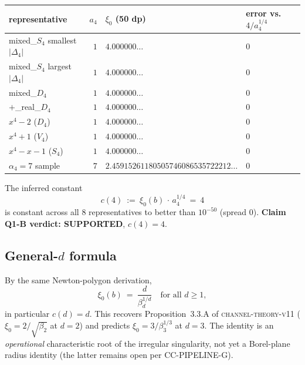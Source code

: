 \begin{tabular}{lrll}
\hline
representative & $a_4$ & $\xi_0$ (50 dp) & error vs.\ $4/a_4^{1/4}$ \\
\hline
mixed\_$S_4$ smallest $|\Delta_4|$ & $1$ & $4.000000\ldots$ & $0$ \\
mixed\_$S_4$ largest  $|\Delta_4|$ & $1$ & $4.000000\ldots$ & $0$ \\
mixed\_$D_4$                       & $1$ & $4.000000\ldots$ & $0$ \\
$+$\_real\_$D_4$                   & $1$ & $4.000000\ldots$ & $0$ \\
$x^4-2$ ($D_4$)                    & $1$ & $4.000000\ldots$ & $0$ \\
$x^4+1$ ($V_4$)                    & $1$ & $4.000000\ldots$ & $0$ \\
$x^4-x-1$ ($S_4$)                  & $1$ & $4.000000\ldots$ & $0$ \\
$\alpha_4=7$ sample                & $7$ & $2.45915261180505746086535722212\ldots$ & $0$ \\
\hline
\end{tabular}

The inferred constant
\[
c(4)\ :=\ \xi_0(b)\,\cdot\,a_4^{1/4}\ =\ 4
\]
is constant across all $8$ representatives to better than $10^{-50}$
(spread $0$).  \textbf{Claim Q1-B verdict: SUPPORTED}, $c(4)=4$.

\subsection*{General-$d$ formula}

By the same Newton-polygon derivation,
\[
\boxed{\ \xi_0(b)\ =\ \frac{d}{\beta_d^{1/d}}\quad\text{for all }d\ge 1,\ }
\]
in particular $c(d)=d$.  This recovers Proposition~3.3.A of
\textsc{channel-theory-v11} ($\xi_0=2/\sqrt{\beta_2}$ at $d=2$) and
predicts $\xi_0=3/\beta_3^{1/3}$ at $d=3$. The identity is an
\emph{operational} characteristic root of the irregular singularity,
not yet a Borel-plane radius identity (the latter remains open
per CC-PIPELINE-G).
